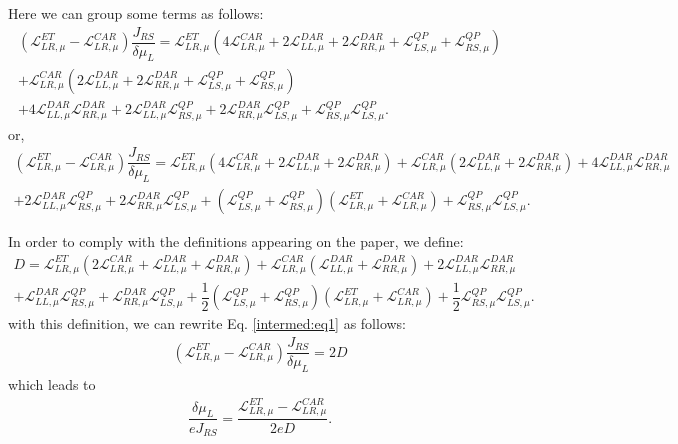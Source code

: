 Here we can group some terms as follows:
\begin{multline*}
(\mathcal{L}_{LR,\mu}^{ET}-\mathcal{L}_{LR,\mu}^{CAR})\dfrac{J_{RS}}{\delta\mu_{L}}=
\mathcal{L}_{LR,\mu}^{ET}(4\mathcal{L}_{LR,\mu}^{CAR}
+
2\mathcal{L}_{LL,\mu}^{DAR}+2\mathcal{L}_{RR,\mu}^{DAR}+\mathcal{L}^{QP}_{LS,\mu}+\mathcal{L}^{QP}_{RS,\mu})
\\+
\mathcal{L}_{LR,\mu}^{CAR}(2\mathcal{L}_{LL,\mu}^{DAR}+2\mathcal{L}_{RR,\mu}^{DAR}+\mathcal{L}^{QP}_{LS,\mu}+\mathcal{L}^{QP}_{RS,\mu})
\\+
4\mathcal{L}_{LL,\mu}^{DAR}\mathcal{L}_{RR,\mu}^{DAR}
+
2\mathcal{L}_{LL,\mu}^{DAR}\mathcal{L}^{QP}_{RS,\mu}
+
2\mathcal{L}_{RR,\mu}^{DAR}\mathcal{L}^{QP}_{LS,\mu}
+
\mathcal{L}^{QP}_{RS,\mu}\mathcal{L}^{QP}_{LS,\mu}.
\end{multline*}
or,
\begin{multline}\label{intermed:eq1}
(\mathcal{L}_{LR,\mu}^{ET}-\mathcal{L}_{LR,\mu}^{CAR})\dfrac{J_{RS}}{\delta\mu_{L}}=
\mathcal{L}_{LR,\mu}^{ET}(4\mathcal{L}_{LR,\mu}^{CAR}
+
2\mathcal{L}_{LL,\mu}^{DAR}+2\mathcal{L}_{RR,\mu}^{DAR})
+
\mathcal{L}_{LR,\mu}^{CAR}(2\mathcal{L}_{LL,\mu}^{DAR}+2\mathcal{L}_{RR,\mu}^{DAR})
+
4\mathcal{L}_{LL,\mu}^{DAR}\mathcal{L}_{RR,\mu}^{DAR}
\\+
2\mathcal{L}_{LL,\mu}^{DAR}\mathcal{L}^{QP}_{RS,\mu}
+
2\mathcal{L}_{RR,\mu}^{DAR}\mathcal{L}^{QP}_{LS,\mu}
+(\mathcal{L}^{QP}_{LS,\mu}+\mathcal{L}^{QP}_{RS,\mu})(\mathcal{L}_{LR,\mu}^{ET}+\mathcal{L}_{LR,\mu}^{CAR})+
\mathcal{L}^{QP}_{RS,\mu}\mathcal{L}^{QP}_{LS,\mu}.
\end{multline}


In order to comply with the definitions appearing on the paper, we define:
\begin{multline}\label{D:def}
D=
\mathcal{L}_{LR,\mu}^{ET}(2\mathcal{L}_{LR,\mu}^{CAR}
+
\mathcal{L}_{LL,\mu}^{DAR}+\mathcal{L}_{RR,\mu}^{DAR})
+
\mathcal{L}_{LR,\mu}^{CAR}(\mathcal{L}_{LL,\mu}^{DAR}+\mathcal{L}_{RR,\mu}^{DAR})
+
2\mathcal{L}_{LL,\mu}^{DAR}\mathcal{L}_{RR,\mu}^{DAR}
\\+
\mathcal{L}_{LL,\mu}^{DAR}\mathcal{L}^{QP}_{RS,\mu}
+
\mathcal{L}_{RR,\mu}^{DAR}\mathcal{L}^{QP}_{LS,\mu}
+
\dfrac{1}{2}(\mathcal{L}^{QP}_{LS,\mu}+\mathcal{L}^{QP}_{RS,\mu})(\mathcal{L}_{LR,\mu}^{ET}+\mathcal{L}_{LR,\mu}^{CAR})
+
\dfrac{1}{2}\mathcal{L}^{QP}_{RS,\mu}\mathcal{L}^{QP}_{LS,\mu}.
\end{multline}
with this definition, we can rewrite Eq. \eqref{intermed:eq1} as follows:
\begin{align}\label{intermed:JRS:muL}
(\mathcal{L}_{LR,\mu}^{ET}-\mathcal{L}_{LR,\mu}^{CAR})\dfrac{J_{RS}}{\delta\mu_{L}}=
2D
\end{align}
which leads to
\begin{align}\label{R:RS:LS:intermed}
\dfrac{\delta\mu_{L}}{eJ_{RS}}=\dfrac{\mathcal{L}_{LR,\mu}^{ET}-\mathcal{L}_{LR,\mu}^{CAR}}{2eD}.
\end{align}

